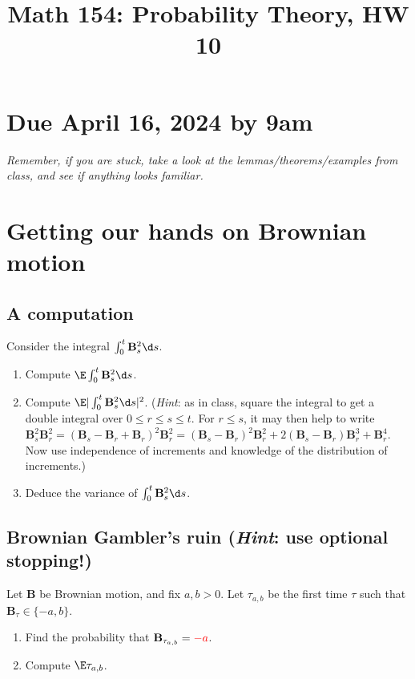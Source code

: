\documentclass[12pt,reqno]{amsart}
\title{\Large Math 154: Probability Theory, HW 10\vspace{-0.1cm}}
\theoremstyle{definition}
\theoremstyle{remark}
\numberwithin{equation}{section}
\newenvironment{nouppercase}{%
  \let\uppercase\relax%
  \renewcommand{\uppercasenonmath}[1]{}}{}
\begin{document}
\begin{nouppercase}
\maketitle
\end{nouppercase}
\section*{Due April 16, 2024 by 9am}
\emph{Remember, if you are stuck, take a look at the lemmas/theorems/examples from class, and see if anything looks familiar.}
\section{Getting our hands on Brownian motion}
\subsection{A computation}
Consider the integral $\int_{0}^{t}\mathbf{B}_{s}^{2}\d s$.
\begin{enumerate}
\item Compute $\E\int_{0}^{t}\mathbf{B}_{s}^{2}\d s$.
\item Compute $\E|\int_{0}^{t}\mathbf{B}_{s}^{2}\d s|^{2}$. (\emph{Hint}: as in class, square the integral to get a double integral over $0\leq r\leq s\leq t$. For $r\leq s$, it may then help to write $\mathbf{B}_{s}^{2}\mathbf{B}_{r}^{2}=(\mathbf{B}_{s}-\mathbf{B}_{r}+\mathbf{B}_{r})^{2}\mathbf{B}_{r}^{2}=(\mathbf{B}_{s}-\mathbf{B}_{r})^{2}\mathbf{B}_{r}^{2}+2(\mathbf{B}_{s}-\mathbf{B}_{r})\mathbf{B}_{r}^{3}+\mathbf{B}_{r}^{4}$. Now use independence of increments and knowledge of the distribution of increments.)
\item Deduce the variance of $\int_{0}^{t}\mathbf{B}_{s}^{2}\d s$.
\end{enumerate}
\subsection{Brownian Gambler's ruin (\emph{Hint}: use optional stopping!)}
Let $\mathbf{B}$ be Brownian motion, and fix $a,b>0$. Let $\tau_{a,b}$ be the first time $\tau$ such that $\mathbf{B}_{\tau}\in\{-a,b\}$.
\begin{enumerate}
\item Find the probability that $\mathbf{B}_{\tau_{a,b}}={\color{red}-a}$.
\item Compute $\E\tau_{a,b}$.
\end{enumerate}
\end{document}
